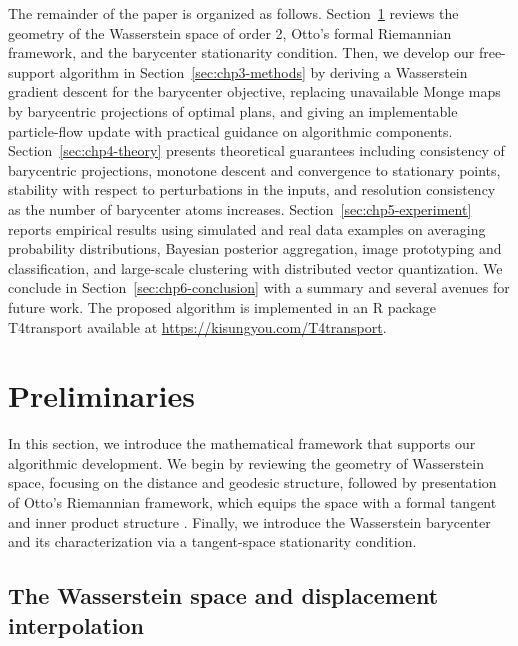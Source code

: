 \documentclass[11pt]{article}
\begin{document}
The remainder of the paper is organized as follows. 
Section~\ref{sec:chp2-prelim} reviews the geometry of the Wasserstein space of order 2, Otto's formal Riemannian framework, and the barycenter stationarity condition. Then, we develop our free-support algorithm in Section~\ref{sec:chp3-methods} by deriving a Wasserstein gradient descent for the barycenter objective, replacing unavailable Monge maps by barycentric projections of optimal plans, and giving an implementable particle-flow update with practical guidance on algorithmic components. Section~\ref{sec:chp4-theory} presents theoretical guarantees including consistency of barycentric projections, monotone descent and convergence to stationary points, stability with respect to perturbations in the inputs, and resolution consistency as the number of barycenter atoms increases. 
Section~\ref{sec:chp5-experiment} reports empirical results using simulated and real data examples on averaging probability distributions, Bayesian posterior aggregation, image prototyping and classification, and large-scale clustering with distributed vector quantization. We conclude in Section~\ref{sec:chp6-conclusion} with a summary and several avenues for future work. The proposed algorithm is implemented in an \textsf{R} package \textsf{T4transport} \citep{you_2020_T4transportToolsComputational} available at \url{https://kisungyou.com/T4transport}.


\section{Preliminaries}\label{sec:chp2-prelim}

In this section, we introduce the mathematical framework that supports our algorithmic development. We begin by reviewing the geometry of Wasserstein space, focusing on the distance and geodesic structure, followed by presentation of Otto's Riemannian framework, which equips the space with a formal tangent and inner product structure \citep{otto_2001_GeometryDissipativeEvolution, ambrosio_2005_GradientFlowsMetric}. Finally, we introduce the Wasserstein barycenter and its characterization via a tangent-space stationarity condition.

\subsection{The Wasserstein space and displacement interpolation}
\end{document}

